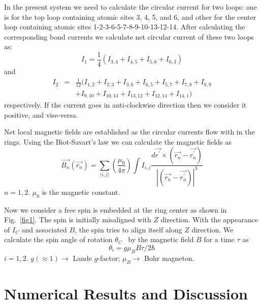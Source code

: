 \documentclass[prb,aps,twocolumn,amsmath,amssymb,floatfix,superscriptaddress]{revtex4}
\begin{document}
In the present system we need to calculate the circular current for two loops: one is for the
top loop containing atomic sites 3, 4, 5, and 6, and other for the center loop containing
atomic sites 1-2-3-6-5-7-8-9-10-13-12-14. After calculating the corresponding bond currents
we calculate net circular current of these two loops as:
\begin{equation}
I_1 = \frac{1}{4}\left(I_{3,4} + I_{4,5} + I_{5,6} + I_{6,3}\right)
\label{eq7a}
\end{equation}
and
\begin{eqnarray}
I_2 & = & \frac{1}{12}(I_{1,2} + I_{2,3} + I_{3,6} + I_{6,5} + I_{5,7} + I_{7,8}
+ I_{8,9} \nonumber \\
& & + I_{9,10} + I_{10,13} + I_{13,12} + I_{12,14} + I_{14,1})
\label{eq7b}
\end{eqnarray}
respectively. If the current goes in anti-clockwise direction then we consider it positive,
and vise-versa. 

Net local magnetic fields are established as the circular currents flow with in the rings.
Using the Biot-Savart's law we can calculate the magnetic fields as
\begin{equation}
\vec{B_n}(\vec{r_n}) = \sum\limits_{\langle i,j \rangle} \left(\frac{\mu_0}{4\pi}
\right)
\int I_{i,j}\frac{d\vec{r^{\prime}} \times(\vec{r_n}-\vec{r^{\prime}_n})}
{|(\vec{r_n}-\vec{r^{\prime}_n})|^3}
\label{eq8}
\end{equation}
$n=1,2$. $\mu_0$ is the magnetic constant. 

Now we consider a free spin is embedded at the ring center as shown
in Fig.~\ref{fig1}. The spin is initially misaligned with $Z$
direction. With the appearance of $I_C$ and associated $B$, the spin
tries to align itself along $Z$ direction. We calculate the spin
angle of rotation $\theta_C$~\cite{ref13,cite12,cite22} by the magnetic field $B$
for a time $\tau$ as
\begin{equation}
\theta_i=g \mu_B B \tau /2\hbar
\label{eq9}
\end{equation}
$i=1,2$. $g(\approx1) \rightarrow$ Lande $g$-factor; $\mu_B \rightarrow$ Bohr magneton.

\section{Numerical Results and Discussion}
\end{document}
